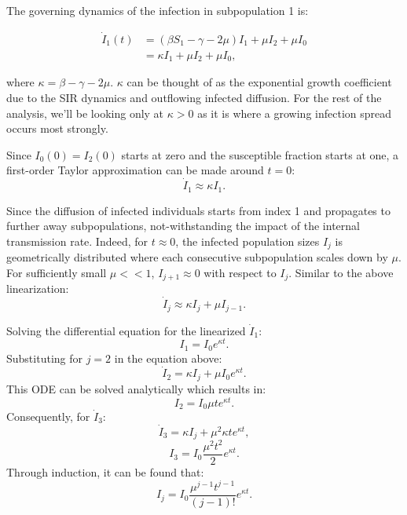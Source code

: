 The governing dynamics of the infection in subpopulation 1 is:

\begin{equation}
\begin{aligned}
\dot I_1(t) &= (\beta S_1 - \gamma - 2\mu) I_1 + \mu I_2 + \mu I_0 \\
            &= \kappa I_1 + \mu I_2 + \mu I_0,
\end{aligned}
\end{equation}

where $\kappa = \beta-\gamma-2\mu$. $\kappa$ can be thought of as the exponential growth coefficient due to the SIR dynamics and outflowing infected diffusion. For the rest of the analysis, we'll be looking only at $\kappa>0$ as it is where a growing infection spread occurs most strongly.

Since $I_0(0)=I_2(0)$ starts at zero and the susceptible fraction starts at one, a first-order Taylor approximation can be made around $t=0$:
\begin{equation}
\dot I_1 \approx \kappa I_1.
\label{eq: kappa}
\end{equation}

Since the diffusion of infected individuals starts from index 1 and propagates to further away subpopulations, not-withstanding the impact of the internal transmission rate. Indeed, for $t \approx 0$, the infected population sizes $I_j$ is geometrically distributed where each consecutive subpopulation scales down by $\mu$. For sufficiently small $\mu<<1$, $I_{j+1} \approx 0$ with respect to $I_j$. Similar to the above linearization:
\begin{equation}
\dot I_j \approx \kappa I_j + \mu I_{j-1}.
\end{equation} 

Solving the differential equation for the linearized $\dot I_1$:
\begin{equation}
I_1 = I_0 e^{\kappa t}.
\end{equation}
Substituting for $j=2$ in the equation above:
\begin{equation}
\dot I_2=\kappa I_j +\mu I_0 e^{\kappa t}.
\end{equation}
This ODE can be solved analytically which results in:
\begin{equation}
I_2=I_0 \mu t e^{\kappa t}.
\end{equation}
Consequently, for $\dot I_3$:
\begin{equation}
\dot I_3=\kappa I_j +\mu^2 \kappa t e^{\kappa t},
\end{equation}
\begin{equation}
I_3 = I_0 \frac{\mu^2 t^2}{2} e^{\kappa t}.
\end{equation}
Through induction, it can be found that:
\begin{equation}
I_j=I_0 \frac{\mu^{j-1} t^{j-1}}{(j-1)!} e^{\kappa t}.
\end{equation}

